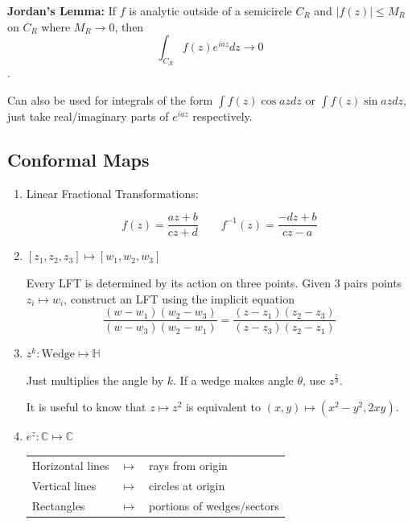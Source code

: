 \documentclass{article}
\begin{document}
\textbf{Jordan's Lemma:}
If $f$ is analytic outside of a semicircle $C_R$ and $|f(z)| \leq M_R$ on $C_R$ where $M_R \rightarrow 0$, then 
\[ \int_{C_R} f(z) e^{iaz} dz \rightarrow 0\].

Can also be used for integrals of the form $\int f(z) \cos az dz$ or $\int f(z) \sin az dz$, just take real/imaginary parts of $e^{iaz}$ respectively.


\subsection{Conformal Maps}

\begin{enumerate}

    \item Linear Fractional Transformations:
        
    \[
    f(z) = \frac{az+b}{cz+d}\qquad f^{-1}(z) = \frac{-dz+b}{cz-a}
    \]
    
    
    \item $[z_1, z_2, z_3] \mapsto [w_1, w_2, w_3]$
    
    Every LFT is determined by its action on three points. Given 3 pairs points $z_i \mapsto w_i$, construct an LFT using the implicit equation
    \[
    \frac{(w-w_1)(w_2-w_3)}{(w-w_3)(w_2-w_1)} = \frac{(z-z_1)(z_2-z_3)}{(z-z_3)(z_2-z_1)}
    \]
    
    
   \item $z^k: \text{Wedge} \mapsto \mathbb{H}$
   
   Just multiplies the angle by $k$. If a wedge makes angle $\theta$, use $z^\frac{\pi}{\theta}$.
   
   It is useful to know that $z\mapsto z^2$ is equivalent to $(x,y) \mapsto (x^2-y^2, 2xy)$.
   
   \item $e^z: \mathbb{C} \mapsto \mathbb{C}$
   
\begin{tabular}{ l c l}
    Horizontal lines & $\mapsto$ & 
    rays from origin  \\
    Vertical lines &$\mapsto$ & 
    circles at origin  \\
    Rectangles &$\mapsto$ & 
    portions of wedges/sectors  \\
\end{tabular}
   

\end{enumerate}
\end{document}
